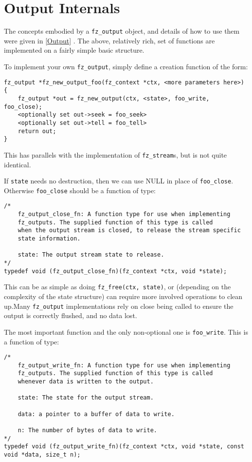 \documentclass[oneside]{book}
\newcommand{\rjwref}[1] {\autoref{#1} \nameref{#1}}
\begin{document}
\chapter{Output Internals}

The concepts embodied by a \texttt{fz\_output} object, and details of how to use them were given in \rjwref{Output}. The above, relatively rich, set of functions are implemented on a fairly simple basic structure.

To implement your own \texttt{fz\_output}, simply define a creation function of the form:

\begin{lstlisting}
fz_output *fz_new_output_foo(fz_context *ctx, <more parameters here>)
{
	fz_output *out = fz_new_output(ctx, <state>, foo_write, foo_close);
	<optionally set out->seek = foo_seek>
	<optionally set out->tell = foo_tell>
	return out;
}
\end{lstlisting}

This has parallels with the implementation of \texttt{fz\_stream}s, but is not quite identical.

If \texttt{state} needs no destruction, then we can use NULL in place of \texttt{foo\_close}. Otherwise \texttt{foo\_close} should be a function of type:

\begin{lstlisting}
/*
	fz_output_close_fn: A function type for use when implementing
	fz_outputs. The supplied function of this type is called
	when the output stream is closed, to release the stream specific
	state information.

	state: The output stream state to release.
*/
typedef void (fz_output_close_fn)(fz_context *ctx, void *state);
\end{lstlisting}

This can be as simple as doing \texttt{fz\_free(ctx, state)}, or (depending on the complexity of the state structure) can require more involved operations to clean up.Many \texttt{fz\_output} implementations rely on close being called to ensure the output is correctly flushed, and no data lost.


The most important function and the only non-optional one is \texttt{foo\_write}. This is a function of type:

\begin{lstlisting}
/*
	fz_output_write_fn: A function type for use when implementing
	fz_outputs. The supplied function of this type is called
	whenever data is written to the output.

	state: The state for the output stream.

	data: a pointer to a buffer of data to write.

	n: The number of bytes of data to write.
*/
typedef void (fz_output_write_fn)(fz_context *ctx, void *state, const void *data, size_t n);
\end{lstlisting}
\end{document}
